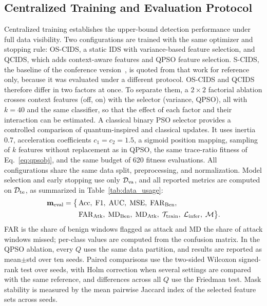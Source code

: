 \documentclass[conference]{IEEEtran}
\begin{document}
\subsection{Centralized Training and Evaluation Protocol}
\label{subsec:centralized_method}
Centralized training establishes the upper-bound detection
performance under full data visibility. 
Two configurations are trained with the same optimizer and stopping
rule: OS-CIDS, a static IDS with variance-based feature selection,
and QCIDS, which adds context-aware features and QPSO feature
selection. S-CIDS, the baseline of the conference
version~\cite{ajakweconquest}, is quoted from that work for reference
only, because it was evaluated under a different protocol.
OS-CIDS and QCIDS therefore differ in two factors at once.
To separate them, a $2\times2$ factorial
ablation crosses context features (off, on) with the selector
(variance, QPSO), all with $k=40$ and the same classifier, so that the
effect of each factor and their interaction can be estimated. A
classical binary PSO selector provides a controlled comparison of
quantum-inspired and classical updates. It uses inertia 0.7,
acceleration coefficients $c_1=c_2=1.5$, a sigmoid position mapping,
sampling of $k$ features without replacement as in QPSO, the same trace-ratio fitness of Eq.~\eqref{eq:qpsobj}, and the
same budget of 620 fitness evaluations. All configurations share
the same data split, preprocessing, and normalization. Model
selection and early stopping use only $\mathcal{D}_{\rm va}$, and all
reported metrics are computed on $\mathcal{D}_{\rm te}$,
as summarized in Table~\ref{tab:data_usage}:
\begin{align}
\mathbf{m}_{\rm eval} = \bigl\{
&\,\mathrm{Acc},\;\mathrm{F1},\;\mathrm{AUC},\;\mathrm{MSE},\;
  \mathrm{FAR}_{\rm Ben},\nonumber\\
&\,\mathrm{FAR}_{\rm Atk},\;\mathrm{MD}_{\rm Ben},\;
  \mathrm{MD}_{\rm Atk},\;
  \mathcal{T}_{\rm train},\;\mathcal{L}_{\rm infer},\;\mathcal{M}
\bigr\}.
\label{eq:central_metrics}
\end{align}
FAR is the share of benign windows flagged as attack and MD the share
of attack windows missed; per-class values are computed from the confusion
matrix. In the
QPSO ablation, every $Q$ uses the same data partition, and results
are reported as mean$\pm$std over ten seeds.
Paired comparisons use the two-sided
Wilcoxon signed-rank test over seeds, with Holm correction when
several settings are compared with the same reference, and
differences across all $Q$ use the Friedman test. Mask stability is
measured by the mean pairwise Jaccard index of the selected feature
sets across seeds.
\end{document}
